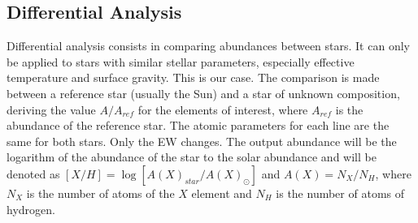 \documentclass[dvips,12pt,a4paper]{report}
\begin{document}
{%










\subsection {Differential Analysis}
\label {difanal}


Differential analysis consists in comparing abundances between stars. It can only be applied to stars with similar stellar parameters, especially effective temperature and surface gravity. This is our case.  The comparison is made between a reference star (usually the Sun) and a star of unknown composition, deriving the value $A/A_{ref}$ for the elements of interest, where $A_{ref}$ is the abundance of the reference star. The atomic parameters for each line are the same for both stars. Only the EW changes. The output abundance will be the logarithm of the abundance of the star to the solar abundance and will be denoted as $[X/H]=\log[A(X)_{star}/A(X)_\odot]$ and $A(X)=N_X/N_H$, where $N_X$ is the number of atoms of the $X$ element and $N_H$ is the number of atoms of hydrogen. %

}
\end{document}
